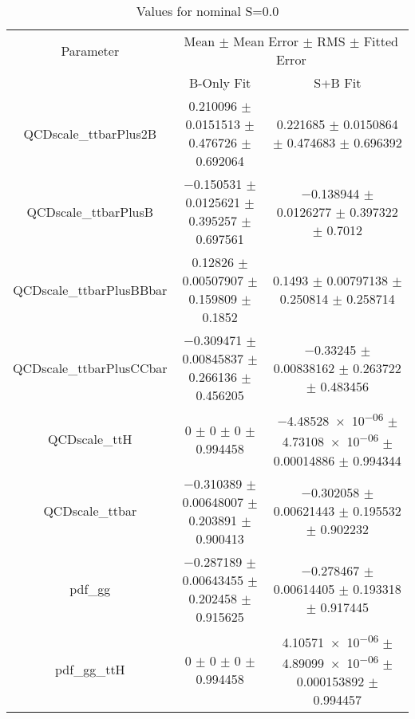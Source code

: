 \begin{table}
\centering
\caption{Values for nominal S=0.0}
\begin{tabular}{ccc}
\toprule
Parameter & \multicolumn{2}{c}{Mean $\pm$ Mean Error $\pm$ RMS $\pm$ Fitted Error}\\
 & B-Only Fit & S+B Fit\\
\midrule
QCDscale\_ttbarPlus2B & \num{0.210096} $\pm$ \num{0.0151513} $\pm$ \num{0.476726} $\pm$ \num{0.692064} & \num{0.221685} $\pm$ \num{0.0150864} $\pm$ \num{0.474683} $\pm$ \num{0.696392}\\
QCDscale\_ttbarPlusB & \num{-0.150531} $\pm$ \num{0.0125621} $\pm$ \num{0.395257} $\pm$ \num{0.697561} & \num{-0.138944} $\pm$ \num{0.0126277} $\pm$ \num{0.397322} $\pm$ \num{0.7012}\\
QCDscale\_ttbarPlusBBbar & \num{0.12826} $\pm$ \num{0.00507907} $\pm$ \num{0.159809} $\pm$ \num{0.1852} & \num{0.1493} $\pm$ \num{0.00797138} $\pm$ \num{0.250814} $\pm$ \num{0.258714}\\
QCDscale\_ttbarPlusCCbar & \num{-0.309471} $\pm$ \num{0.00845837} $\pm$ \num{0.266136} $\pm$ \num{0.456205} & \num{-0.33245} $\pm$ \num{0.00838162} $\pm$ \num{0.263722} $\pm$ \num{0.483456}\\
QCDscale\_ttH & \num{0} $\pm$ \num{0} $\pm$ \num{0} $\pm$ \num{0.994458} & \num{-4.48528e-06} $\pm$ \num{4.73108e-06} $\pm$ \num{0.00014886} $\pm$ \num{0.994344}\\
QCDscale\_ttbar & \num{-0.310389} $\pm$ \num{0.00648007} $\pm$ \num{0.203891} $\pm$ \num{0.900413} & \num{-0.302058} $\pm$ \num{0.00621443} $\pm$ \num{0.195532} $\pm$ \num{0.902232}\\
pdf\_gg & \num{-0.287189} $\pm$ \num{0.00643455} $\pm$ \num{0.202458} $\pm$ \num{0.915625} & \num{-0.278467} $\pm$ \num{0.00614405} $\pm$ \num{0.193318} $\pm$ \num{0.917445}\\
pdf\_gg\_ttH & \num{0} $\pm$ \num{0} $\pm$ \num{0} $\pm$ \num{0.994458} & \num{4.10571e-06} $\pm$ \num{4.89099e-06} $\pm$ \num{0.000153892} $\pm$ \num{0.994457}\\
\bottomrule
\end{tabular}
\end{table}